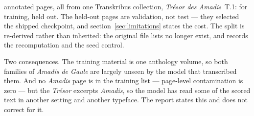 \trainPages{} annotated pages, all from one Transkribus collection,
\emph{Trésor des Amadis}~T.1: \trainPagesTrain{} for training,
\trainPagesVal{} held out. The held-out pages are validation, not test --- they
selected the shipped checkpoint, and section~\ref{sec:limitations} states the
cost. The split is re-derived rather than inherited: the original file lists no
longer exist, and  records the
recomputation and the seed control.

Two consequences. The training material is one
anthology volume, so both families of \emph{Amadis de Gaule} are largely unseen
by the model that transcribed them. And no \emph{Amadis} page is in the
training list --- page-level contamination is zero --- but the \emph{Trésor}
excerpts \emph{Amadis}, so the model has read some of the scored text in
another setting and another typeface. The report states this and does not
correct for it.
